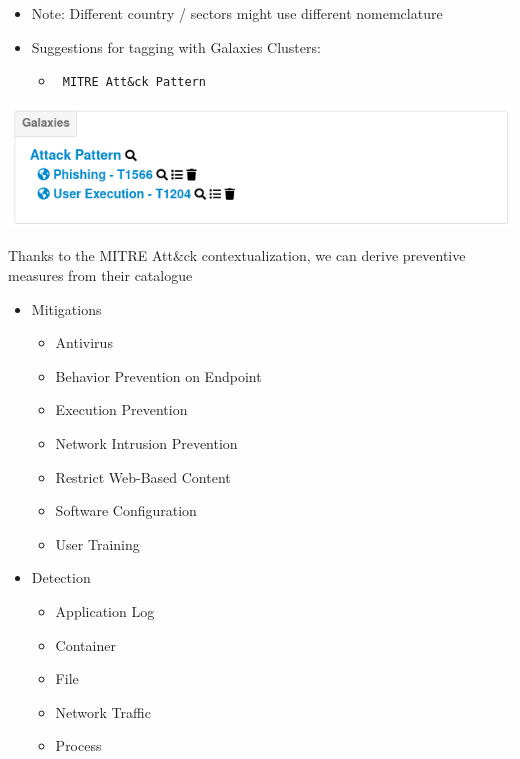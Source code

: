 \begin{frame}
    \begin{itemize}
        \item Note: Different country / sectors might use different nomemclature
        \item Suggestions for tagging with Galaxies Clusters:
        \begin{itemize}
            \item \texttt{\color{black} MITRE Att\&ck Pattern}
        \end{itemize}
    \end{itemize}
    \vspace{1cm}
    \includegraphics[width=1.0\linewidth]{pictures/case1/event-clusters.png}
\end{frame}

\begin{frame}
    Thanks to the MITRE Att\&ck contextualization, we can derive preventive measures from their catalogue
    \begin{itemize}
        \item Mitigations
        \begin{itemize}
            \item Antivirus
            \item Behavior Prevention on Endpoint 
            \item Execution Prevention
            \item Network Intrusion Prevention
            \item Restrict Web-Based Content
            \item Software Configuration
            \item User Training
        \end{itemize}
        \item Detection
        \begin{itemize}
            \item Application Log
            \item Container
            \item File
            \item Network Traffic
            \item Process
        \end{itemize}
    \end{itemize}
\end{frame}

